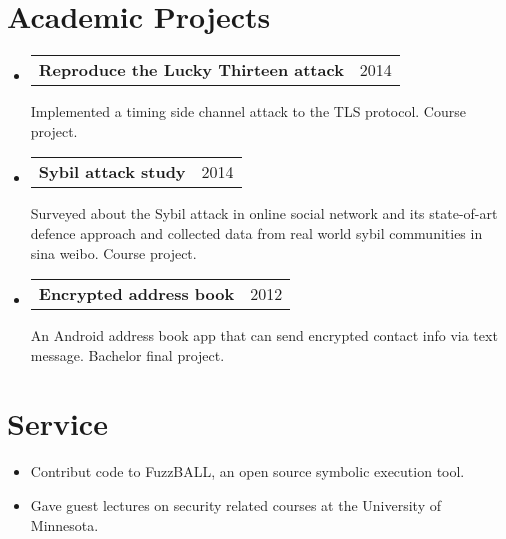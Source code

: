 \documentclass[letterpaper,11pt]{article}
\makeatletter
\newcommand{\myitem}[1]{
  \item[-]\small{
    { #1 \vspace{-2pt}}
  }
}
\newcommand{\project}[3]{
  \vspace{-1pt}\item[]
  \begin{tabular*}{0.97\textwidth}{l@{\extracolsep{\fill}}r}
  \textbf{\small#1} & {\small#2}\\
  \end{tabular*}
      {\small#3}\vspace{-5pt}
}
\newcommand{\content}{\begin{itemize}[leftmargin=0px]}
\newcommand{\contentend}{\end{itemize}}
\newcommand{\mylist}{\begin{itemize}[leftmargin=25px,rightmargin=25px]}
\newcommand{\mylistend}{\end{itemize}\vspace{-5pt}}
\makeatother
\begin{document}
\section{Academic Projects}
  \content  	
    \project
      {Reproduce the Lucky Thirteen attack}{2014}
      {Implemented a timing side channel attack to the TLS protocol. 
    Course project.}
    \project
      {Sybil attack study}{2014}
      {Surveyed about the Sybil attack in online social network and its state-of-art defence approach
      and collected data from real world sybil communities in sina weibo. Course project.}
    \project
      {Encrypted address book}{2012}
      {An Android address book app that can send encrypted contact info via text message. 
      Bachelor final project.}
  \contentend

\section{Service}
\mylist
\myitem{Contribut code to FuzzBALL, an open source symbolic execution tool.}
\myitem{Gave guest lectures on security related courses at the University of Minnesota.}
\mylistend



\end{document}
